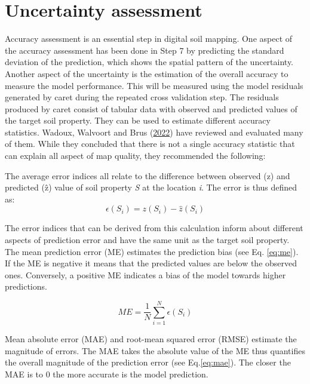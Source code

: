 \documentclass[
  10pt,
  b5paper,
  oneside]{book}
\begin{document}
\hypertarget{uncertainty-assessment}{%
\section{Uncertainty assessment}\label{uncertainty-assessment}}

Accuracy assessment is an essential step in digital soil mapping. One aspect of the accuracy assessment has been done in Step 7 by predicting the standard deviation of the prediction, which shows the spatial pattern of the uncertainty. Another aspect of the uncertainty is the estimation of the overall accuracy to measure the model performance. This will be measured using the model residuals generated by caret during the repeated cross validation step.
The residuals produced by caret consist of tabular data with observed and predicted values of the target soil property. They can be used to estimate different accuracy statistics. Wadoux, Walvoort and Brus (\protect\hyperlink{ref-Wadoux2022}{2022}) have reviewed and evaluated many of them. While they concluded that there is not a single accuracy statistic that can explain all aspect of map quality, they recommended the following:

The average error indices all relate to the difference between observed (z) and predicted (ẑ) value of soil property \emph{S} at the location \emph{i}. The error \epsilon is thus defined as:
\begin{equation}
\epsilon(S_{i}) = z(S_{i}) - \hat{z}(S_{i})
\end{equation}

The error indices that can be derived from this calculation inform about different aspects of prediction error and have the same unit as the target soil property. The mean prediction error (ME) estimates the prediction bias (see Eq. \eqref{eq:me}). If the ME is negative it means that the predicted values are below the observed ones. Conversely, a positive ME indicates a bias of the model towards higher predictions.

\begin{equation} 
  ME = \frac{1}{N}\sum_{i=1}^{N}\epsilon(S_{i})
  \label{eq:me}
\end{equation}

Mean absolute error (MAE) and root-mean squared error (RMSE) estimate the magnitude of errors. The MAE takes the absolute value of the ME thus quantifies the overall magnitude of the prediction error (see Eq.\eqref{eq:mae}). The closer the MAE is to 0 the more accurate is the model prediction.
\end{document}
